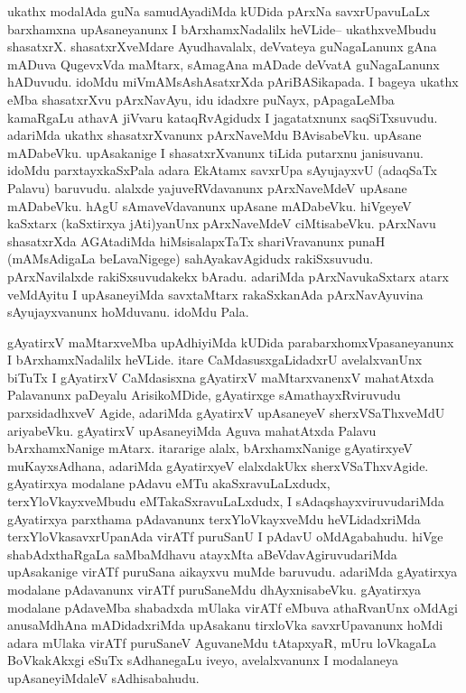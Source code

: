 
\begin{artha}
ukathx modalAda guNa samudAyadiMda kUDida pArxNa savxrUpavuLaLx barxhamxna upAsaneyanunx I bArxhamxNadalilx heVLide{\rm --} ukathxveMbudu shasatxrX. shasatxrXveMdare Ayudhavalalx, deVvateya guNagaLanunx gAna mADuva QugevxVda maMtarx, sAmagAna mADade deVvatA guNagaLanunx hADuvudu. idoMdu miVmAMsAshAsatxrXda pAriBASikapada. I bageya ukathx eMba shasatxrXvu pArxNavAyu, idu idadxre puNayx, pApagaLeMba kamaRgaLu athavA jiVvaru kataqRvAgidudx I jagatatxnunx saqSiTxsuvudu. adariMda ukathx shasatxrXvanunx pArxNaveMdu BAvisabeVku. upAsane mADabeVku. upAsakanige I shasatxrXvanunx tiLida putarxnu janisuvanu. idoMdu parxtayxkaSxPala adara EkAtamx savxrUpa sAyujayxvU (adaqSaTx Palavu) baruvudu. alalxde yajuveRVdavanunx pArxNaveMdeV upAsane mADabeVku. hAgU sAmaveVdavanunx upAsane mADabeVku. hiVgeyeV kaSxtarx (kaSxtirxya jAti)yanUnx pArxNaveMdeV ciMtisabeVku. pArxNavu shasatxrXda AGAtadiMda hiMsisalapxTaTx shariVravanunx punaH (mAMsAdigaLa beLavaNigege) sahAyakavAgidudx rakiSxsuvudu. pArxNavilalxde rakiSxsuvudakekx bAradu. adariMda pArxNavukaSxtarx atarx veMdAyitu I upAsaneyiMda savxtaMtarx rakaSxkanAda pArxNavAyuvina sAyujayxvanunx hoMduvanu.  idoMdu Pala.
\end{artha}



\begin{artha}
gAyatirxV maMtarxveMba upAdhiyiMda kUDida parabarxhomxVpasaneyanunx I bArxhamxNadalilx heVLide. itare CaMdasusxgaLidadxrU avelalxvanUnx biTuTx  I gAyatirxV CaMdasisxna gAyatirxV maMtarxvanenxV mahatAtxda Palavanunx paDeyalu ArisikoMDide, gAyatirxge sAmathayxRviruvudu parxsidadhxveV Agide, adariMda gAyatirxV upAsaneyeV sherxVSaThxveMdU ariyabeVku. gAyatirxV upAsaneyiMda Aguva mahatAtxda Palavu bArxhamxNanige mAtarx. itararige alalx, bArxhamxNanige gAyatirxyeV muKayxsAdhana, adariMda gAyatirxyeV elalxdakUkx sherxVSaThxvAgide. gAyatirxya modalane pAdavu eMTu akaSxravuLaLxdudx, terxYloVkayxveMbudu eMTakaSxravuLaLxdudx, I sAdaqshayxviruvudariMda gAyatirxya parxthama pAdavanunx terxYloVkayxveMdu heVLidadxriMda terxYloVkasavxrUpanAda virATf puruSanU I pAdavU oMdAgabahudu. hiVge shabAdxthaRgaLa saMbaMdhavu atayxMta aBeVdavAgiruvudariMda upAsakanige virATf puruSana aikayxvu muMde baruvudu. adariMda gAyatirxya modalane pAdavanunx virATf puruSaneMdu dhAyxnisabeVku. gAyatirxya modalane pAdaveMba shabadxda mUlaka virATf eMbuva athaRvanUnx oMdAgi anusaMdhAna mADidadxriMda upAsakanu tirxloVka savxrUpavanunx hoMdi adara mUlaka virATf puruSaneV AguvaneMdu tAtapxyaR, mUru loVkagaLa BoVkakAkxgi eSuTx sAdhanegaLu iveyo, avelalxvanunx I modalaneya upAsaneyiMdaleV sAdhisabahudu.
\end{artha}

